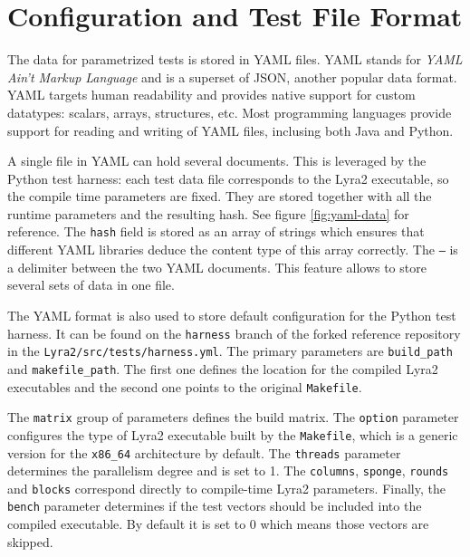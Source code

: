 \chapter{Configuration and Test File Format}
\label{chapter:yaml}

The data for parametrized tests is stored in YAML files. YAML stands for \emph{YAML Ain't Markup Language} and is a superset of JSON, another popular data format. YAML targets human readability and provides native support for custom datatypes: scalars, arrays, structures, etc. Most programming languages provide support for reading and writing of YAML files, inclusing both Java and Python.

A single file in YAML can hold several documents. This is leveraged by the Python test harness: each test data file corresponds to the Lyra2 executable, so the compile time parameters are fixed. They are stored together with all the runtime parameters and the resulting hash. See figure \ref{fig:yaml-data} for reference. The \texttt{hash} field is stored as an array of strings which ensures that different YAML libraries deduce the content type of this array correctly. The \texttt{---} is a delimiter between the two YAML documents. This feature allows to store several sets of data in one file.

The YAML format is also used to store default configuration for the Python test harness. It can be found on the \texttt{harness} branch of the forked reference repository \cite{github:2017:lyra-copy} in the \texttt{Lyra2/src/tests/harness.yml}. The primary parameters are \texttt{build_path} and \texttt{makefile_path}. The first one defines the location for the compiled Lyra2 executables and the second one points to the original \texttt{Makefile}.

The \texttt{matrix} group of parameters defines the build matrix. The \texttt{option} parameter configures the type of Lyra2 executable built by the \texttt{Makefile}, which is a generic version for the \texttt{x86_64} architecture by default. The \texttt{threads} parameter determines the parallelism degree and is set to 1. The \texttt{columns}, \texttt{sponge}, \texttt{rounds} and \texttt{blocks} correspond directly to compile-time Lyra2 parameters. Finally, the \texttt{bench} parameter determines if the test vectors should be included into the compiled executable. By default it is set to 0 which means those vectors are skipped.

